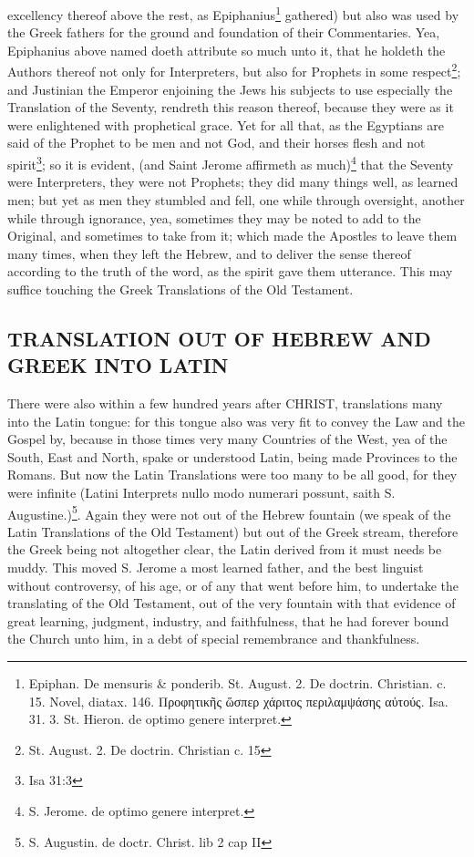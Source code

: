 excellency thereof above the rest, as Epiphanius\footnote{Epiphan. De mensuris \& ponderib. St. August. 2. De doctrin. Christian. c. 15. Novel, diatax. 146. \foreignlanguage{greek}{Προφητικῆς ὥσπερ χάριτος περιλαμψάσης αὐτούς.} Isa. 31. 3. St. Hieron. de optimo genere interpret.} gathered) but also was used by the Greek fathers for the ground and foundation of their Commentaries. Yea, Epiphanius above named doeth attribute so much unto it, that he holdeth the Authors thereof not only for Interpreters, but also for Prophets in some respect\footnote{St. August. 2. De doctrin. Christian c. 15}; and Justinian the Emperor enjoining the Jews his subjects to use especially the Translation of the Seventy, rendreth this reason thereof, because they were as it were enlightened with prophetical grace. Yet for all that, as the Egyptians are said of the Prophet to be men and not God, and their horses flesh and not spirit\footnote{Isa 31:3}; so it is evident, (and Saint Jerome affirmeth as much)\footnote{S. Jerome. de optimo genere interpret.} that the Seventy were Interpreters, they were not Prophets; they did many things well, as learned men; but yet as men they stumbled and fell, one while through oversight, another while through ignorance, yea, sometimes they may be noted to add to the Original, and sometimes to take from it; which made the Apostles to leave them many times, when they left the Hebrew, and to deliver the sense thereof according to the truth of the word, as the spirit gave them utterance. This may suffice touching the Greek Translations of the Old Testament.

\subsection{TRANSLATION OUT OF HEBREW AND GREEK INTO LATIN}

There were also within a few hundred years after CHRIST, translations many into the Latin tongue: for this tongue also was very fit to convey the Law and the Gospel by, because in those times very many Countries of the West, yea of the South, East and North, spake or understood Latin, being made Provinces to the Romans. But now the Latin Translations were too many to be all good, for they were infinite (Latini Interprets nullo modo numerari possunt, saith S. Augustine.)\footnote{S. Augustin. de doctr. Christ. lib 2 cap II}. Again they were not out of the Hebrew fountain (we speak of the Latin Translations of the Old Testament) but out of the Greek stream, therefore the Greek being not altogether clear, the Latin derived from it must needs be muddy. This moved S. Jerome a most learned father, and the best linguist without controversy, of his age, or of any that went before him, to undertake the translating of the Old Testament, out of the very fountain with that evidence of great learning, judgment, industry, and faithfulness, that he had forever bound the Church unto him, in a debt of special remembrance and thankfulness.

